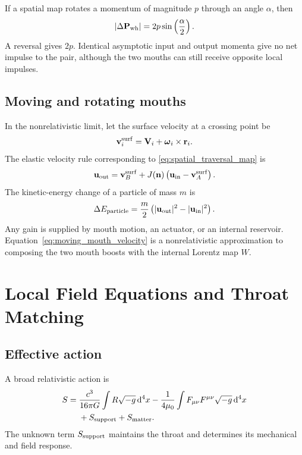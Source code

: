 \documentclass[journal,a4paper]{IEEEtran}
\begin{document}
If a spatial map rotates a momentum of magnitude \(p\) through an angle \(\alpha\), then
\begin{equation}
    |\Delta\mathbf P_{\rm wh}|
    =2p\sin\left(\frac{\alpha}{2}\right).
\end{equation}
A reversal gives \(2p\). Identical asymptotic input and output momenta give no net impulse to the pair, although the two mouths can still receive opposite local impulses.

\subsection{Moving and rotating mouths}

In the nonrelativistic limit, let the surface velocity at a crossing point be
\begin{equation}
    \mathbf v_i^{\rm surf}
    =\mathbf V_i+\boldsymbol\omega_i\times\mathbf r_i.
\end{equation}
The elastic velocity rule corresponding to \eqref{eq:spatial_traversal_map} is
\begin{equation}
    \mathbf u_{\rm out}
    =\mathbf v_B^{\rm surf}
    +J(\mathbf n)
    \left(\mathbf u_{\rm in}-\mathbf v_A^{\rm surf}\right).
    \label{eq:moving_mouth_velocity}
\end{equation}
The kinetic-energy change of a particle of mass \(m\) is
\begin{equation}
    \Delta E_{\rm particle}
    =\frac{m}{2}
    \left(|\mathbf u_{\rm out}|^2-|\mathbf u_{\rm in}|^2\right).
\end{equation}
Any gain is supplied by mouth motion, an actuator, or an internal reservoir. Equation~\eqref{eq:moving_mouth_velocity} is a nonrelativistic approximation to composing the two mouth boosts with the internal Lorentz map \(W\).

\section{Local Field Equations and Throat Matching}
\label{sec:fields}

\subsection{Effective action}

A broad relativistic action is
\begin{equation}
\begin{split}
S={}&\frac{c^3}{16\pi G}
\int R\sqrt{-g}\,\mathrm{d}^4x
-\frac{1}{4\mu_0}
\int F_{\mu\nu}F^{\mu\nu}\sqrt{-g}\,\mathrm{d}^4x\\
&+S_{\rm support}+S_{\rm matter}.
\label{eq:relativistic_action}
\end{split}
\end{equation}
The unknown term \(S_{\rm support}\) maintains the throat and determines its mechanical and field response.
\end{document}
